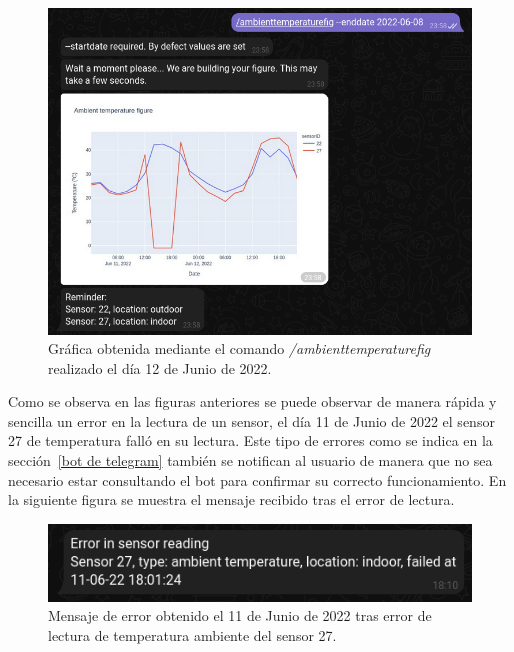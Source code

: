 \documentclass[a4paper, 12pt, oneside]{book}
\begin{document}
\begin{figure}[H]
	\centering
    \includegraphics[width=12cm, keepaspectratio]{img/ambienttemperaturefig_enddate}
    \caption{Gráfica obtenida mediante el comando \textit{/ambienttemperaturefig} realizado el día 12 de Junio de 2022.}
    \label{figura:ambienttemperaturefig_enddate}
\end{figure}

Como se observa en las figuras anteriores se puede observar de manera rápida y sencilla un error en la lectura de un sensor, el día 11 de Junio de 2022 el sensor 27 de temperatura falló en su lectura. 
Este tipo de errores como se indica en la sección~\ref{bot de telegram} también se notifican al usuario de manera que no sea necesario estar consultando el bot para confirmar su correcto funcionamiento. En la siguiente figura se muestra el mensaje recibido tras el error de lectura.
\begin{figure}[H]
	\centering
    \includegraphics[width=12cm, keepaspectratio]{img/error_sensor_11_junio}
    \caption{Mensaje de error obtenido el 11 de Junio de 2022 tras error de lectura de temperatura ambiente del sensor 27.}
    \label{figura:error_sensor_11_junio}
\end{figure}
\end{document}
